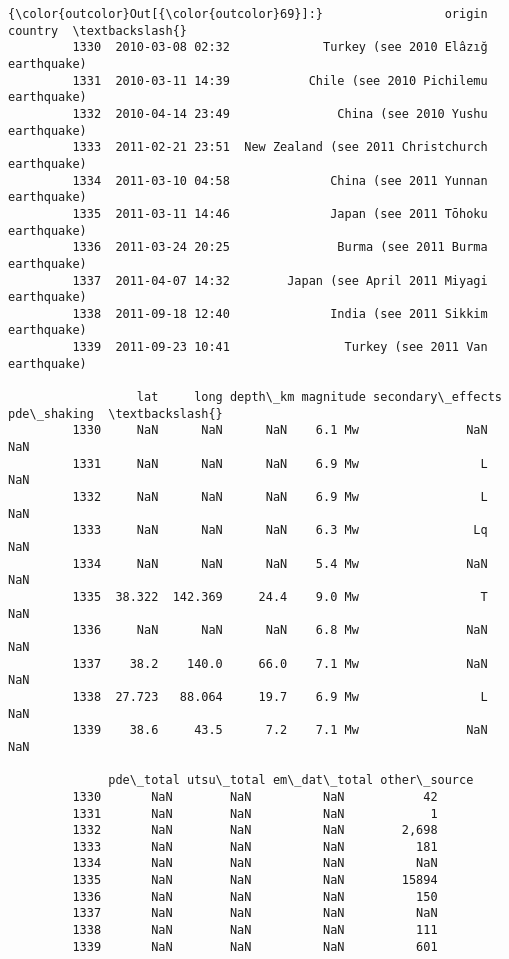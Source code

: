 \documentclass[11pt]{article}
\begin{document}
\begin{Verbatim}[commandchars=\\\{\}]
{\color{outcolor}Out[{\color{outcolor}69}]:}                 origin                                         country  \textbackslash{}
         1330  2010-03-08 02:32             Turkey (see 2010 Elâzığ earthquake)   
         1331  2010-03-11 14:39           Chile (see 2010 Pichilemu earthquake)   
         1332  2010-04-14 23:49               China (see 2010 Yushu earthquake)   
         1333  2011-02-21 23:51  New Zealand (see 2011 Christchurch earthquake)   
         1334  2011-03-10 04:58              China (see 2011 Yunnan earthquake)   
         1335  2011-03-11 14:46              Japan (see 2011 Tōhoku earthquake)   
         1336  2011-03-24 20:25               Burma (see 2011 Burma earthquake)   
         1337  2011-04-07 14:32        Japan (see April 2011 Miyagi earthquake)   
         1338  2011-09-18 12:40              India (see 2011 Sikkim earthquake)   
         1339  2011-09-23 10:41                Turkey (see 2011 Van earthquake)   
         
                  lat     long depth\_km magnitude secondary\_effects pde\_shaking  \textbackslash{}
         1330     NaN      NaN      NaN    6.1 Mw               NaN         NaN   
         1331     NaN      NaN      NaN    6.9 Mw                 L         NaN   
         1332     NaN      NaN      NaN    6.9 Mw                 L         NaN   
         1333     NaN      NaN      NaN    6.3 Mw                Lq         NaN   
         1334     NaN      NaN      NaN    5.4 Mw               NaN         NaN   
         1335  38.322  142.369     24.4    9.0 Mw                 T         NaN   
         1336     NaN      NaN      NaN    6.8 Mw               NaN         NaN   
         1337    38.2    140.0     66.0    7.1 Mw               NaN         NaN   
         1338  27.723   88.064     19.7    6.9 Mw                 L         NaN   
         1339    38.6     43.5      7.2    7.1 Mw               NaN         NaN   
         
              pde\_total utsu\_total em\_dat\_total other\_source  
         1330       NaN        NaN          NaN           42  
         1331       NaN        NaN          NaN            1  
         1332       NaN        NaN          NaN        2,698  
         1333       NaN        NaN          NaN          181  
         1334       NaN        NaN          NaN          NaN  
         1335       NaN        NaN          NaN        15894  
         1336       NaN        NaN          NaN          150  
         1337       NaN        NaN          NaN          NaN  
         1338       NaN        NaN          NaN          111  
         1339       NaN        NaN          NaN          601  
\end{Verbatim}
            
\end{document}

